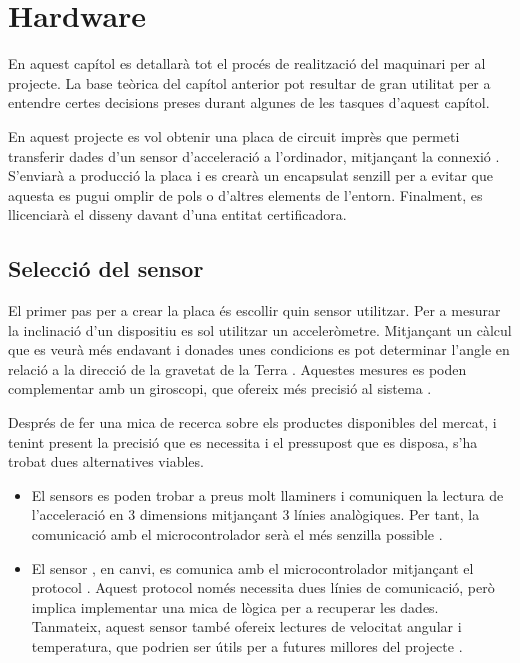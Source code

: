 \chapter{Hardware}

En aquest capítol es detallarà tot el procés de realització del maquinari per
al projecte. La base teòrica del capítol anterior pot resultar de gran utilitat
per a entendre certes decisions preses durant algunes de les tasques d'aquest
capítol.

En aquest projecte es vol obtenir una placa de circuit imprès que permeti
transferir dades d'un sensor d'acceleració a l'ordinador, mitjançant la connexió
. S'enviarà a producció la placa i es crearà un encapsulat senzill per
a evitar que aquesta es pugui omplir de pols o d'altres elements de l'entorn.
Finalment, es llicenciarà el disseny davant d'una entitat certificadora.

\section{Selecció del sensor}
\label{sec:sensor_selection}

El primer pas per a crear la placa és escollir quin sensor utilitzar. Per a
mesurar la inclinació d'un dispositiu es sol utilitzar un acceleròmetre.
Mitjançant un càlcul que es veurà més endavant i donades unes condicions es pot
determinar l'angle en relació a la direcció de la gravetat de la Terra
\cite{PedleyTilt}.
Aquestes mesures es poden complementar amb un giroscopi, que ofereix més
precisió al sistema \cite{6702711}.

Després de fer una mica de recerca sobre els productes disponibles del mercat,
i tenint present la precisió que es necessita i el pressupost que es disposa,
s'ha trobat dues alternatives viables.

\begin{itemize}
    \item El sensors  es poden trobar a preus molt llaminers i
    comuniquen la lectura de l'acceleració en 3 dimensions mitjançant 3 línies
    analògiques. Per tant, la comunicació amb el microcontrolador serà el més
    senzilla possible \cite{adxl335}.
    \item El sensor , en canvi, es comunica amb el microcontrolador
    mitjançant el protocol . Aquest protocol només necessita dues
    línies de comunicació, però implica implementar una mica de lògica per a
    recuperar les dades. Tanmateix, aquest sensor també ofereix lectures de
    velocitat angular i temperatura, que podrien ser útils per a futures
    millores del projecte \cite{mpu6050specs}.
\end{itemize}

